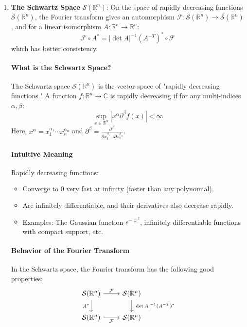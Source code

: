 \documentclass[uplatex,a4j,12pt,dvipdfmx]{jsarticle}
\begin{document}
\begin{enumerate}
	\item \textbf{The Schwartz Space $\mathcal{S}(\mathbb{R}^n)$}:
	      On the space of rapidly decreasing functions $\mathcal{S}(\mathbb{R}^n)$, the Fourier transform gives an automorphism $\mathcal{F}: \mathcal{S}(\mathbb{R}^n) \to \mathcal{S}(\mathbb{R}^n)$, and for a linear isomorphism $A: \mathbb{R}^n \to \mathbb{R}^n$:
	      \[
		      \mathcal{F} \circ A^* = |\det A|^{-1} (A^{-T})^* \circ \mathcal{F}
	      \]
	      which has better consistency.



	      \paragraph{What is the Schwartz Space?}
	      The Schwartz space $\mathcal{S}(\mathbb{R}^n)$ is the vector space of "rapidly decreasing functions."
	      A function $f: \mathbb{R}^n \to \mathbb{C}$ is rapidly decreasing if for any multi-indices $\alpha, \beta$:
	      \[
		      \sup_{x \in \mathbb{R}^n} |x^\alpha \partial^\beta f(x)| < \infty
	      \]
	      Here, $x^\alpha = x_1^{\alpha_1} \cdots x_n^{\alpha_n}$ and $\partial^\beta = \frac{\partial^{|\beta|}}{\partial x_1^{\beta_1} \cdots \partial x_n^{\beta_n}}$.


	      \paragraph{Intuitive Meaning}
	      Rapidly decreasing functions:
	      \begin{itemize}
		      \item Converge to 0 very fast at infinity (faster than any polynomial).
		      \item Are infinitely differentiable, and their derivatives also decrease rapidly.
		      \item Examples: The Gaussian function $e^{-|x|^2}$, infinitely differentiable functions with compact support, etc.
	      \end{itemize}

	      \paragraph{Behavior of the Fourier Transform}
	      In the Schwartz space, the Fourier transform has the following good properties:
	      \[
		      \begin{tikzcd}
			      \mathcal{S}(\mathbb{R}^n) \arrow[r, "\mathcal{F}"] \arrow[d, "A^*"']
			      & \mathcal{S}(\mathbb{R}^n) \arrow[d, "|\det A|^{-1} (A^{-T})^*"] \\
			      \mathcal{S}(\mathbb{R}^n) \arrow[r, "\mathcal{F}"']
			      & \mathcal{S}(\mathbb{R}^n)
		      \end{tikzcd}
	      \]


\end{enumerate}
\end{document}
